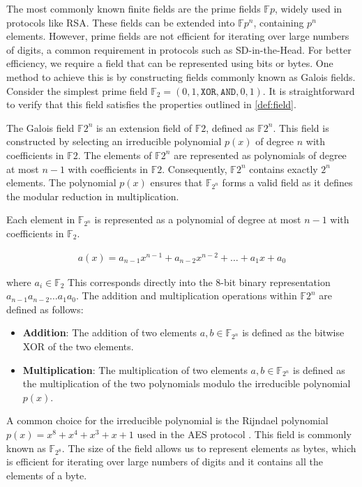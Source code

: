 \documentclass[twoside,11pt,openright]{report}
\theoremstyle{definition}
\theoremstyle{plain}
\begin{document}
\noindent
The most commonly known finite fields are the prime fields $\mathbb{F}p$, widely used in protocols like RSA. These fields can be extended into $\mathbb{F}{p^n}$, containing $p^n$ elements. However, prime fields are not efficient for iterating over large numbers of digits, a common requirement in protocols such as SD-in-the-Head. For better efficiency, we require a field that can be represented using bits or bytes. One method to achieve this is by constructing fields commonly known as Galois fields. Consider the simplest prime field $\mathbb{F}_2 = ({0,1}, \texttt{XOR}, \texttt{AND}, 0, 1)$. It is straightforward to verify that this field satisfies the properties outlined in \autoref{def:field}.

The Galois field $\mathbb{F}{2^n}$ is an extension field of $\mathbb{F}2$, defined as $\mathbb{F}{2^n}$. This field is constructed by selecting an irreducible polynomial $p(x)$ of degree $n$ with coefficients in $\mathbb{F}2$. The elements of $\mathbb{F}{2^n}$ are represented as polynomials of degree at most $n-1$ with coefficients in $\mathbb{F}2$. Consequently, $\mathbb{F}{2^n}$ contains exactly $2^n$ elements. The polynomial $p(x)$ ensures that $\mathbb{F}_{2^n}$ forms a valid field as it defines the modular reduction in multiplication.

Each element in $\mathbb{F}_{2^n}$ is represented as a polynomial of degree at most $n-1$ with coefficients in $\mathbb{F}_2$.

\begin{align*}
  a(x) = a_{n-1}x^{n-1} + a_{n-2}x^{n-2} + \dots + a_1x + a_0
\end{align*}

where $a_i \in \mathbb{F}_2$ This corresponds directly into the 8-bit binary representation $a_{n-1}a_{n-2}\dots a_1a_0$. The addition and multiplication operations within $\mathbb{F}{2^n}$ are defined as follows:

\begin{itemize}
  \item \textbf{Addition}: The addition of two elements $a,b \in \mathbb{F}_{2^n}$ is defined as the bitwise XOR of the two elements.
  \item \textbf{Multiplication}: The multiplication of two elements $a,b \in \mathbb{F}_{2^n}$ is defined as the multiplication of the two polynomials modulo the irreducible polynomial $p(x)$.
\end{itemize}

A common choice for the irreducible polynomial is the Rijndael polynomial $p(x) = x^8 + x^4 + x^3 + x + 1$ used in the AES protocol \cite{brownadvanced}. This field is commonly known as $\mathbb{F}_{2^8}$. The size of the field allows us to represent elements as bytes, which is efficient for iterating over large numbers of digits and it contains all the elements of a byte.
\end{document}
